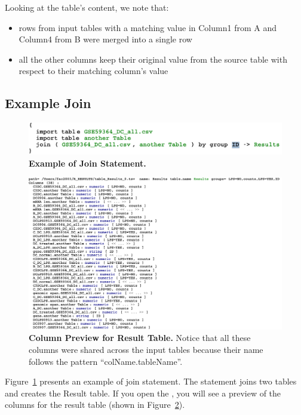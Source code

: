 Looking at the table's content, we note that:
\begin{itemize}
	\item rows from input tables with a matching value in Column1 from A and Column4 from B were merged into a single row
	\item all the other columns keep their original value from the source table with respect to their matching column's value
\end{itemize}


\subsection{Example Join}

\begin{figure}[h!tbp]
  \centering
  \includegraphics[width=\figWidthWide]{figures/ExampleJoin.pdf}
\caption[Example of Join Statement.]{\textbf{Example of Join Statement.}}
\label{fig:ExampleJoinStatement}
\end{figure}

\begin{figure}[h!bp]
  \centering
  \includegraphics[width=\figWidthWide]{figures/ExampleJoinColumnPreview.pdf}
\caption[Column Preview for Result Table.]{\textbf{Column Preview for Result Table.} Notice that all these columns were shared across the input tables because their name follows the pattern ``colName.tableName''.}
\label{fig:ColumnPreviewExample}
\end{figure}

Figure~\ref{fig:ExampleJoinStatement} presents an example of join statement. The statement joins two tables and creates the Result table. If you open the \inspectorTabIcon{}, you will see a preview of the columns for the result table (shown in Figure~\ref{fig:ColumnPreviewExample}). 



